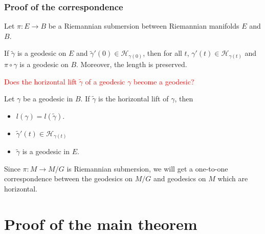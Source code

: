 \documentclass{beamer}
\begin{document}
	\begin{frame}
		\frametitle<presentation>{Proof of the correspondence}
		\p 
		 Let $\pi:E\to B$ be a Riemannian submersion between Riemannian manifolds $E$ and $B$.
		 \p 
		\begin{lemma}[O'Neil]
        	If $\tilde{\gamma}$ is a geodesic on $E$ and $\tilde{\gamma}'(0)\in \mathcal{H}_{\gamma(0)}$, \p then for all $t$, $\gamma'(t)\in \mathcal{H}_{\gamma(t)}$ \p and $\pi\circ \gamma$ is a geodesic on $B$. Moreover, the length is preserved.
        \end{lemma}


		 \p\textcolor{red}{Does the horizontal lift $\tilde{\gamma}$ of a geodesic $\gamma$ become a geodesic?}

		\p
		\begin{lemma}
			Let $\gamma$ be a geodesic in $B$. If $\tilde{\gamma}$ is the horizontal lift of $\gamma$, then
			\begin{itemize}
				\p \item $l \left(\gamma\right)=l \left(\tilde{\gamma}\right)$.\tabularnewline
				\p \item $\tilde{\gamma}'(t)\in \mathcal{H}_{\gamma(t)}$
				\p \item $\tilde{\gamma}$ is a geodesic in $E$.
			\end{itemize}
		\end{lemma}
		
        \p Since $\pi:M\to M/G$ is Riemannian submersion, \p we will get a one-to-one correspondence between the geodesics on $M/G$ and geodesics on $M$ which are horizontal.
	\end{frame}	


	\section{Proof of the main theorem}
\end{document}
